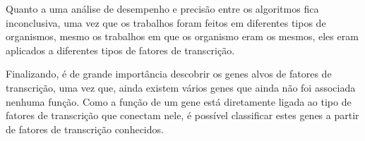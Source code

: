 Quanto a uma análise de desempenho e precisão entre os algoritmos fica inconclusiva, uma vez que os trabalhos foram feitos em diferentes tipos de organismos, mesmo os trabalhos em que os organismo eram os mesmos, eles eram aplicados a diferentes tipos de fatores de transcrição.

Finalizando, é de grande importância descobrir os genes alvos de fatores de transcrição, uma vez que, ainda existem vários genes que ainda não foi associada nenhuma função. Como a função de um gene está diretamente ligada ao tipo de fatores de transcrição que conectam nele, é possível classificar estes genes a partir de fatores de transcrição conhecidos.
